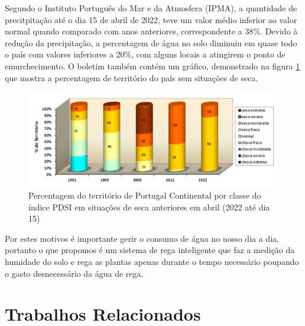 \documentclass[conference]{IEEEtran}
\begin{document}
Segundo o Instituto Português do Mar e da Atmosfera (IPMA), 
a quantidade de precitpitação até o dia 15 de abril de 2022, teve um valor médio inferior ao valor normal 
quando comparado com anos anteriores, correspondente a 38\%. Devido à redução da precipitação, 
a percentagem de água no solo diminuiu em quase todo o país com valores inferiores a 20\%, com alguns locais 
a atingirem o ponto de emurchecimento. O boletim também contém um gráfico, demonstrado na figura \ref{fig:ipmagraph} 
que mostra a percentagem de território do país sem situações de seca. \cite{ipmaboletim}

\begin{figure}[h]
    \centering
    \includegraphics[scale=0.5]{grafico-seca-portugal.png}
    \caption{Percentagem do território de Portugal Continental por classe do índice PDSI em situações de seca anteriores em abril (2022 até dia 15)}
    \label{fig:ipmagraph}
\end{figure}

Por estes motivos é importante gerir o consumo de água no nosso dia a dia, 
portanto o que propomos é um sistema de rega inteligente que faz a 
medição da humidade do solo e rega as plantas apenas durante o tempo 
necessário poupando o gasto desnecessário da água de rega.

\section{Trabalhos Relacionados}
\end{document}
